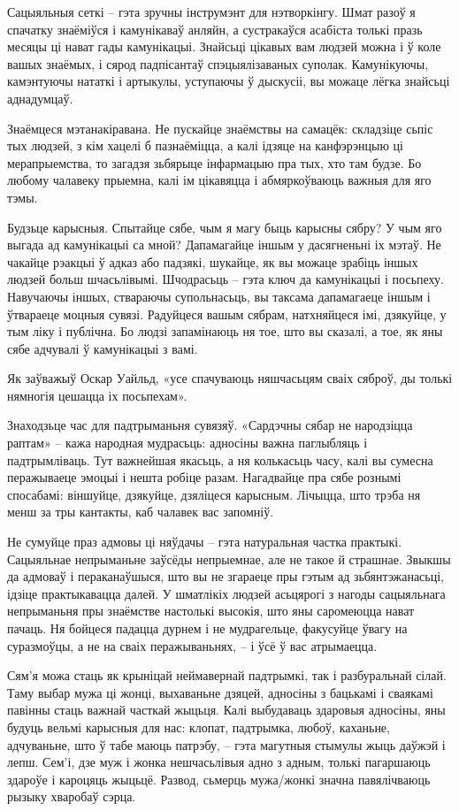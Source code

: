 Сацыяльныя сеткі – гэта зручны інструмэнт для нэтворкінгу. Шмат разоў я спачатку знаёміўся і камунікаваў анляйн, а сустракаўся асабіста толькі празь месяцы ці нават гады камунікацыі. Знайсьці цікавых вам людзей можна і ў коле вашых знаёмых, і сярод падпісантаў спэцыялізаваных суполак. Камунікуючы, камэнтуючы нататкі і артыкулы, уступаючы ў дыскусіі, вы можаце лёгка знайсьці аднадумцаў.

Знаёмцеся мэтанакіравана. Не пускайце знаёмствы на самацёк: складзіце сьпіс тых людзей, з кім хацелі б пазнаёміцца, а калі ідзяце на канфэрэнцыю ці мерапрыемства, то загадзя зьбярыце інфармацыю пра тых, хто там будзе. Бо любому чалавеку прыемна, калі ім цікавяцца і абмяркоўваюць важныя для яго тэмы.

Будзьце карысныя. Спытайце сябе, чым я магу быць карысны сябру? У чым яго выгада ад камунікацыі са мной? Дапамагайце іншым у дасягненьні іх мэтаў. Не чакайце рэакцыі ў адказ або падзякі, шукайце, як вы можаце зрабіць іншых людзей больш шчасьлівымі. Шчодрасьць – гэта ключ да камунікацыі і посьпеху. Навучаючы іншых, ствараючы супольнасьць, вы таксама дапамагаеце іншым і ўтвараеце моцныя сувязі. Радуйцеся вашым сябрам, натхняйцеся імі, дзякуйце, у тым ліку і публічна. Бо людзі запамінаюць ня тое, што вы сказалі, а тое, як яны сябе адчувалі ў камунікацыі з вамі.

Як заўважыў Оскар Уайльд, «усе спачуваюць няшчасьцям сваіх сяброў, ды толькі нямногія цешацца іх посьпехам».

Знаходзьце час для падтрыманьня сувязяў. «Сардэчны сябар не народзіцца раптам» – кажа народная мудрасьць: адносіны важна паглыбляць і падтрымліваць. Тут важнейшая якасьць, а ня колькасьць часу, калі вы сумесна перажываеце эмоцыі і нешта робіце разам. Нагадвайце пра сябе рознымі спосабамі: віншуйце, дзякуйце, дзяліцеся карысным. Лічыцца, што трэба ня менш за тры кантакты, каб чалавек вас запомніў.

Не сумуйце праз адмовы ці няўдачы – гэта натуральная частка практыкі. Сацыяльнае непрыманьне заўсёды непрыемнае, але не такое й страшнае. Звыкшы да адмоваў і пераканаўшыся, што вы не згараеце пры гэтым ад зьбянтэжанасьці, ідзіце практыкавацца далей. У шматлікіх людзей асьцярогі з нагоды сацыяльнага непрыманьня пры знаёмстве настолькі высокія, што яны саромеюцца нават пачаць. Ня бойцеся падацца дурнем і не мудрагельце, факусуйце ўвагу на суразмоўцы, а не на сваіх перажываньнях, – і ўсё ў вас атрымаецца.

Сям'я можа стаць як крыніцай неймавернай падтрымкі, так і разбуральнай сілай. Таму выбар мужа ці жонці, выхаваньне дзяцей, адносіны з бацькамі і сваякамі павінны стаць важнай часткай жыцьця. Калі выбудаваць здаровыя адносіны, яны будуць вельмі карысныя для нас: клопат, падтрымка, любоў, каханьне, адчуваньне, што ў табе маюць патрэбу, – гэта магутныя стымулы жыць даўжэй і лепш. Сем'і, дзе муж і жонка нешчасьлівыя адно з адным, толькі пагаршаюць здароўе і кароцяць жыцьцё. Развод, сьмерць мужа/жонкі значна павялічваюць рызыку хваробаў сэрца. 

